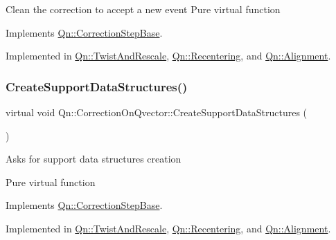 Clean the correction to accept a new event Pure virtual function 

Implements \mbox{\hyperlink{classQn_1_1CorrectionStepBase_a879c47010a868c19bd08042445662e2e}{Qn\+::\+Correction\+Step\+Base}}.



Implemented in \mbox{\hyperlink{classQn_1_1TwistAndRescale_a07d06e5a437221d08bdba6078af1c596}{Qn\+::\+Twist\+And\+Rescale}}, \mbox{\hyperlink{classQn_1_1Recentering_a692ae2cc6740be54d0b1591a3db62d39}{Qn\+::\+Recentering}}, and \mbox{\hyperlink{classQn_1_1Alignment_aba2ba181fbf1572b646ed0d225cb773b}{Qn\+::\+Alignment}}.

\mbox{\label{classQn_1_1CorrectionOnQvector_ac7c019bc36ac90618ed6e5fc768ca593}} 
\subsubsection{\texorpdfstring{Create\+Support\+Data\+Structures()}{CreateSupportDataStructures()}}
{\footnotesize\ttfamily virtual void Qn\+::\+Correction\+On\+Qvector\+::\+Create\+Support\+Data\+Structures (\begin{DoxyParamCaption}{ }\end{DoxyParamCaption})\hspace{0.3cm}{\ttfamily [pure virtual]}}

Asks for support data structures creation

Pure virtual function 

Implements \mbox{\hyperlink{classQn_1_1CorrectionStepBase_a800ac634950eb231d72033b03cc899cd}{Qn\+::\+Correction\+Step\+Base}}.



Implemented in \mbox{\hyperlink{classQn_1_1TwistAndRescale_af28bb42098c1b3138769d1747f06468f}{Qn\+::\+Twist\+And\+Rescale}}, \mbox{\hyperlink{classQn_1_1Recentering_a6aa8507e24f482af1d7fdd55151b3d34}{Qn\+::\+Recentering}}, and \mbox{\hyperlink{classQn_1_1Alignment_afb0137bb2443eb44448bf15734096765}{Qn\+::\+Alignment}}.

\mbox{\label{classQn_1_1CorrectionOnQvector_addcdd98787c99ea34a2511be2cdc8de4}} 
